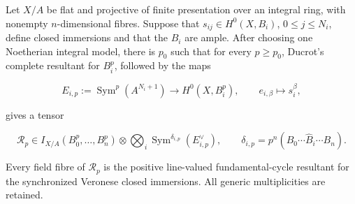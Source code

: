 \begin{corollary}
\label{cor:p171-revised2-veronese-resultants}
Let \(X/A\) be flat and projective of finite presentation over an integral
ring, with nonempty \(n\)-dimensional fibres.  Suppose that
\(s_{ij}\in H^0(X,B_i)\), \(0\leq j\leq N_i\), define closed immersions and
that the \(B_i\) are ample.  After choosing one Noetherian integral model,
there is \(p_0\) such that for every \(p\geq p_0\), Ducrot's complete
resultant \cite[Section~6.3]{Ducrot97CubeIntersection} for \(B_i^p\),
followed by the maps

\[
 E_{i,p}:=\operatorname{Sym}^p(A^{N_i+1})\longrightarrow H^0(X,B_i^p),
 \qquad e_{i,\beta}\longmapsto s_i^\beta,
\]

gives a tensor

\[
 \mathcal R_p\in I_{X/A}(B_0^p,\ldots,B_n^p)\otimes
 \bigotimes_i\operatorname{Sym}^{\delta_{i,p}}(E_{i,p}^\vee),
 \qquad
 \delta_{i,p}=p^n(B_0\cdots\widehat B_i\cdots B_n).
\]

Every field fibre of \(\mathcal R_p\) is the positive line-valued
fundamental-cycle resultant for the synchronized Veronese closed
immersions.  All generic multiplicities are retained.
\end{corollary}
